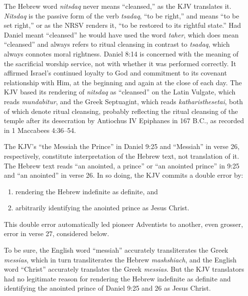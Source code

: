 The Hebrew word \textit{nitsdaq} never means ``cleansed,'' as the KJV translates it.
\textit{Nitsdaq} is the passive form of the verb \textit{tsadaq}, ``to be right,'' and means ``to
be set right,'' or as the NRSV renders it, ``to be restored to its rightful
state.'' Had Daniel meant ``cleansed'' he would have used the word \textit{taher}, which
does mean ``cleansed'' and always refers to ritual cleansing in contrast to
\textit{tsadaq}, which always connotes moral rightness. 
\newpage
Daniel 8:14 is concerned with the meaning of the sacrificial worship
service, not with whether it was performed correctly. It affirmed Israel's
continued loyalty to God and commitment to its covenant relationship with
Him, at the beginning and again at the close of each day. The KJV based its
rendering of \textit{nitsdaq} as ``cleansed'' on the Latin Vulgate, which reads
\textit{mundabitur}, and the Greek Septuagint, which reads \textit{katharisthesetai}, both of
which denote ritual cleansing, probably reflecting the ritual cleansing of
the temple after its desecration by Antiochus IV Epiphanes in 167 B.C., as
recorded in 1 Maccabees 4:36--54.

The KJV's ``the Messiah the Prince'' in Daniel 9:25 and ``Messiah'' in verse 26,
respectively, constitute interpretation of the Hebrew text, not translation
of it. The Hebrew text reads ``an anointed, a prince'' or ``an anointed prince''
in 9:25 and ``an anointed'' in verse 26. In so doing, the KJV commits a double
error by: 
\begin{enumerate}
	\item rendering the Hebrew indefinite as definite, and 
	\item arbitrarily identifying the anointed prince as Jesus Christ.
\end{enumerate}
This double
error automatically led pioneer Adventists to another, even grosser, error
in verse 27, considered below.

To be sure, the English word ``messiah'' accurately transliterates the Greek
\textit{messias}, which in turn transliterates the Hebrew \textit{mashshiach}, and the English
word ``Christ'' accurately translates the Greek \textit{messias}. But the KJV
translators had no legitimate reason for rendering the Hebrew indefinite as 
definite and identifying the anointed prince of Daniel 9:25 and 26 as Jesus
Christ.

